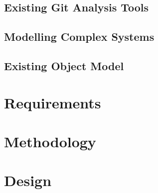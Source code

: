 \documentclass[11pt]{book}
\begin{document}

\section{Existing Git Analysis Tools}

\section{Modelling Complex Systems}

\section{Existing Object Model}	
		


\chapter{Requirements}

\chapter{Methodology}

\chapter{Design}
\end{document}
